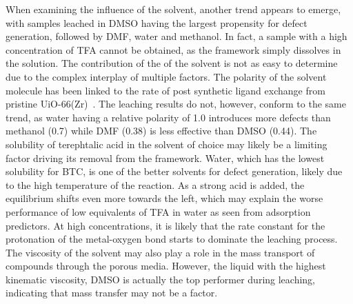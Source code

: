 When examining the influence of the solvent, another trend appears
to emerge, with samples leached in DMSO having the largest propensity
for defect generation, followed by DMF, water and methanol. In fact,
a sample with a high concentration of TFA cannot be obtained, as the 
framework simply dissolves in the solution.
The contribution of the of the solvent is not as easy to determine due
to the complex interplay of multiple factors.
The polarity of the solvent molecule has been linked to 
the rate of post synthetic ligand exchange from
pristine UiO-66(Zr)~\cite{kimPostsyntheticLigandExchange2012}. The leaching
results do not, however, conform to the same trend, as water having a 
relative polarity of 1.0 introduces more defects than methanol 
(0.7) while DMF (0.38) is less effective than 
DMSO (0.44). The solubility of terephtalic acid in the solvent 
of choice may likely be a limiting factor driving its removal
from the framework. Water, which has the lowest solubility for 
BTC, is one of the better solvents for defect generation, likely
due to the high temperature of the reaction. As a strong acid
is added, the equilibrium shifts even more towards the 
left, which may explain the worse performance of low equivalents of TFA
in water as seen from adsorption predictors. At high concentrations,
it is likely that the rate constant for the protonation of the 
metal-oxygen bond starts to dominate the leaching process.
The viscosity of the 
solvent may also play a role in the mass transport of compounds 
through the porous media. However, the liquid with the highest 
kinematic viscosity, DMSO is actually the top performer during leaching,
indicating that mass transfer may not be a factor.

